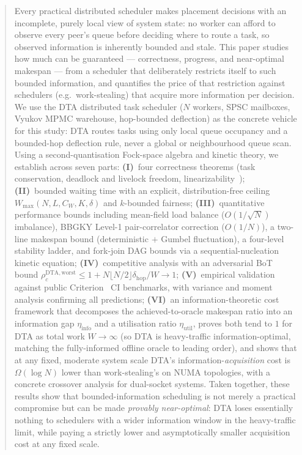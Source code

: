 \documentclass[11pt,a4paper]{article}
\begin{document}
\begin{abstract}
Every practical distributed scheduler makes placement decisions with an
incomplete, purely local view of system state: no worker can afford to
observe every peer's queue before deciding where to route a task, so
observed information is inherently bounded and stale.  This paper studies
how much can be guaranteed --- correctness, progress, and near-optimal
makespan --- from a scheduler that deliberately restricts itself to such
bounded information, and quantifies the price of that restriction against
schedulers (e.g.\ work-stealing) that acquire more information per
decision.  We use the \textsc{DTA} distributed task scheduler ($N$ workers,
SPSC mailboxes, Vyukov MPMC warehouse, hop-bounded deflection) as the
concrete vehicle for this study: DTA routes tasks using only local queue
occupancy and a bounded-hop deflection rule, never a global or
neighbourhood queue scan.  Using a second-quantisation Fock-space algebra
and kinetic theory, we establish across seven parts:
\textbf{(I)}~four correctness theorems (task conservation, deadlock and
livelock freedom, linearizability~\cite{herlihy_wing1990,herlihy_shavit2008});
\textbf{(II)}~bounded waiting time with an explicit, distribution-free ceiling
$W_{\max}(N,L,C_W,K,\delta)$
and $k$-bounded fairness;
\textbf{(III)}~quantitative performance bounds including mean-field load
balance ($O(1/\sqrt{N})$ imbalance), BBGKY Level-1 pair-correlator
correction ($O(1/N)$), a two-line makespan bound (deterministic
$+$ Gumbel fluctuation), a four-level stability ladder, and fork-join
DAG bounds via a sequential-nucleation kinetic equation;
\textbf{(IV)}~competitive analysis with an adversarial BoT bound
$\rho_c^{\mathrm{DTA,worst}} \leq 1 + N\lfloor N/2\rfloor\delta_{\mathrm{hop}}/W \to 1$;
\textbf{(V)}~empirical validation against public Criterion~\cite{criterion} CI benchmarks,
with variance and moment analysis confirming all predictions;
\textbf{(VI)}~an information-theoretic cost framework that decomposes
the achieved-to-oracle makespan ratio into an information gap
$\eta_{\mathrm{info}}$ and a utilisation ratio $\eta_{\mathrm{util}}$,
proves both tend to $1$ for DTA as total work $W \to \infty$ (so DTA is
heavy-traffic information-optimal, matching the fully-informed offline
oracle to leading order), and shows that at any fixed, moderate system
scale DTA's information-\emph{acquisition} cost is $\Omega(\log N)$
lower than work-stealing's on NUMA topologies, with a concrete crossover
analysis for dual-socket systems.
Taken together, these results show that bounded-information scheduling is
not merely a practical compromise but can be made \emph{provably
near-optimal}: DTA loses essentially nothing to schedulers with a wider
information window in the heavy-traffic limit, while paying a strictly
lower and asymptotically smaller acquisition cost at any fixed scale.
\end{abstract}
\end{document}
